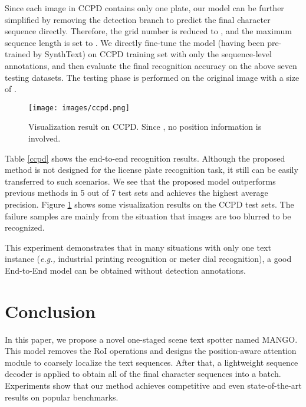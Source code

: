 \documentclass[letterpaper]{article} \usepackage{aaai21}  \usepackage{times}  \usepackage{helvet} \usepackage{courier}  \usepackage[hyphens]{url}  \usepackage{graphicx} \urlstyle{rm} \def\UrlFont{\rm}  \usepackage{natbib}  \usepackage{caption} \frenchspacing  \setlength{\pdfpagewidth}{8.5in}  \setlength{\pdfpageheight}{11in}  \usepackage{multirow}
\begin{document}
Since each image in CCPD contains only one plate, our model can be further simplified by removing the detection branch to  predict the final character sequence directly. Therefore, the grid number is reduced to , and the maximum sequence length is set to .
We directly fine-tune the model (having been pre-trained by SynthText) on CCPD training set with only the sequence-level annotations, and then evaluate the final recognition accuracy on the above seven testing datasets. The testing phase is performed on the original image with a size of .
\begin{figure}[!htpt]
\begin{center}
\texttt{[image: images/ccpd.png]}\\
\end{center}
   \caption{
   Visualization result on CCPD. Since , no position information is involved.
   }
\label{fig:ccpd}
\end{figure}

Table \ref{ccpd} shows the end-to-end recognition results. Although the proposed method is not designed for the license plate recognition task, it still can be easily transferred to such scenarios.
We see that the proposed model outperforms previous methods in 5 out of 7 test sets and achieves the highest average precision.
Figure \ref{fig:ccpd} shows some visualization results on the CCPD test sets.
The failure samples are mainly from the situation that images are too blurred to be recognized.


This experiment demonstrates that in many situations with only one text instance (\emph{e.g.,} industrial printing recognition or meter dial recognition), a good End-to-End model can be obtained without detection annotations.

\section{Conclusion}
In this paper, we propose a novel one-staged scene text spotter named {MANGO}.
This model removes the RoI operations and designs the position-aware attention module to coarsely localize the text sequences.
After that, a lightweight sequence decoder is applied to obtain all of the final character sequences into a batch.
Experiments show that our method achieves competitive and even state-of-the-art results on popular benchmarks.


\newpage
{\footnotesize{


}
}
\end{document}
